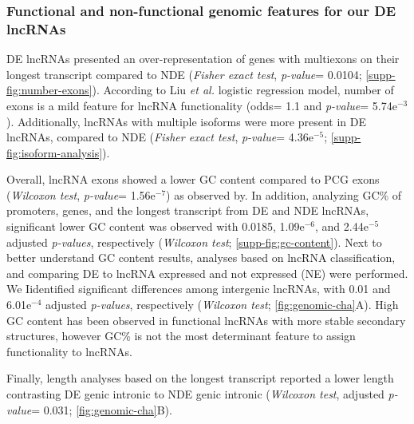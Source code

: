 \subsubsection{Functional and non-functional genomic features for our DE lncRNAs}
\label{sec:genomic-features}

DE lncRNAs presented an over-representation of genes with multiexons on their longest transcript compared to NDE (\textit{Fisher exact test}, \textit{p-value}= 0.0104; \autoref{supp-fig:number-exons}). According to Liu \textit{et al.} logistic regression model,\autocite{liu_2017_crispri} number of exons is a mild feature for lncRNA functionality (odds= 1.1 and \textit{p-value}= 5.74e$^{-3}$). Additionally, lncRNAs with multiple isoforms were more present in DE lncRNAs, compared to NDE (\textit{Fisher exact test}, \textit{p-value}= 4.36e$^{-5}$; \autoref{supp-fig:isoform-analysis}). 

Overall, lncRNA exons showed a lower GC content compared to PCG exons (\textit{Wilcoxon test}, \textit{p-value}= 1.56e$^{-7}$) as observed by.\autocite{lopez_2017} In addition, analyzing GC\% of promoters, genes, and the longest transcript from DE and NDE lncRNAs, significant lower GC content was observed with 0.0185, 1.09e$^{-6}$, and 2.44e$^{-5}$ adjusted \textit{p-values}, respectively (\textit{Wilcoxon test}; \autoref{supp-fig:gc-content}). Next to better understand GC content results, analyses based on lncRNA classification, and comparing DE to lncRNA expressed and not expressed (NE) were performed. We Iidentified significant differences among intergenic lncRNAs, with 0.01 and 6.01e$^{-4}$ adjusted \textit{p-values}, respectively (\textit{Wilcoxon test}; \autoref{fig:genomic-cha}A). High GC content has been observed in functional lncRNAs with more stable secondary structures,\autocite{lopez_2017} however GC\% is not the most determinant feature to assign functionality to lncRNAs.\autocite{haswell_2020}

Finally, length analyses based on the longest transcript reported a lower length contrasting DE genic intronic to NDE genic intronic (\textit{Wilcoxon test}, adjusted \textit{p-value}= 0.031; \autoref{fig:genomic-cha}B). 

